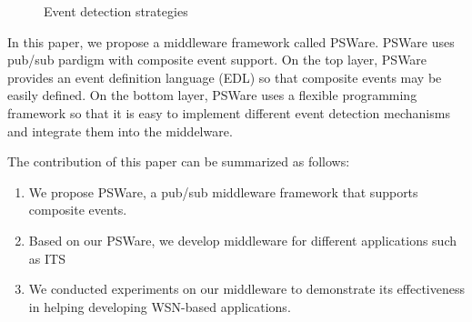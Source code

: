 \begin{figure}
\centering
{}
\caption{Event detection strategies}
\label{fig:rooms}
\end{figure}

In this paper, we propose a middleware framework called PSWare. PSWare uses pub/sub pardigm with composite event support. On the top layer, PSWare provides an event definition language (EDL) so that composite events may be easily defined. On the bottom layer, PSWare uses a flexible programming framework so that it is easy to implement different event detection mechanisms and integrate them into the middelware.

The contribution of this paper can be summarized as follows:
\begin{enumerate}
  \item We propose PSWare, a pub/sub middleware framework that supports composite events.
  \item Based on our PSWare, we develop middleware for different applications such as ITS
  \item We conducted experiments on our middleware to demonstrate its effectiveness in helping developing WSN-based applications.
\end{enumerate}
